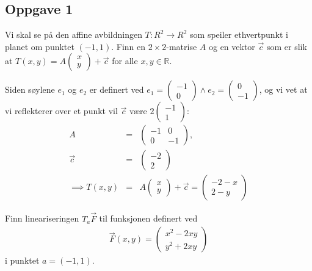 \documentclass{../../myassignment}
\begin{document}
	\subsection*{Oppgave 1}
		\begin{problem}
			Vi skal se på den affine avbildningen $T: R^2 \to R^2$ som speiler ethvertpunkt i planet om punktet $(-1, 1)$. Finn en $2 \times 2$-matrise $A$ og en vektor $\vec{c}$ som er slik at $T(x,y) = A \begin{pmatrix}x\\y\end{pmatrix} + \vec{c}$ for alle $x,y \in \mathbb{R}$.
		\end{problem}
	
		\begin{answer}
			Siden s{\o}ylene $e_1$ og $e_2$ er definert ved $e_1 = \begin{pmatrix} -1 \\ 0 \end{pmatrix} \land e_2 = \begin{pmatrix} 0 \\ -1 \end{pmatrix}$, og vi vet at vi reflekterer over et punkt vil $\vec{c}$ v{\ae}re $2\begin{pmatrix} -1 \\ 1 \end{pmatrix}$:
			\begin{eqnarray*}
				A &=& \begin{pmatrix} -1 & 0 \\ 0 & -1 \end{pmatrix},\\
				\vec{c} &=& \begin{pmatrix} -2 \\ 2 \end{pmatrix}\\
				\implies
				T(x,y) &=& A\begin{pmatrix}x\\y\end{pmatrix} + \vec{c} = \begin{pmatrix} -2-x \\ 2-y \end{pmatrix}
			\end{eqnarray*}
		\end{answer}

		\begin{problem}
			Finn lineariseringen $T_a \vec{F}$ til funksjonen definert ved 
				\begin{eqnarray*}
					\vec{F}(x,y) = \begin{pmatrix}
						x^2-2xy \\
						y^2+2xy
					\end{pmatrix}
				\end{eqnarray*}
			i punktet $a=(-1,1)$.
		\end{problem}
\end{document}
